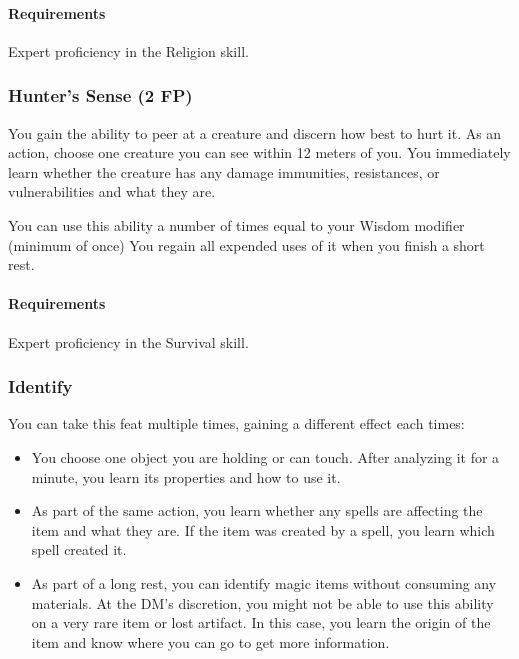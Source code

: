     \paragraph{Requirements} Expert proficiency in the Religion skill.
\subsubsection{Hunter's Sense (2 FP)} \label{feat::hunterssense}
    You gain the ability to peer at a creature and discern how best to hurt it.
    As an action, choose one creature you can see within 12 meters of you.
    You immediately learn whether the creature has any damage immunities, resistances, or vulnerabilities and what they are.

    You can use this ability a number of times equal to your Wisdom modifier (minimum of once)
     You regain all expended uses of it when you finish a short rest.
    \paragraph{Requirements} Expert proficiency in the Survival skill.
\subsubsection{Identify} \label{feat::identify}
    You can take this feat multiple times, gaining a different effect each times:
    \begin{itemize}
        \item You choose one object you are holding or can touch.
        After analyzing it for a minute, you learn its properties and how to use it.
        \item As part of the same action, you learn whether any spells are affecting the item and what they are.
        If the item was created by a spell, you learn which spell created it.
        \item As part of a long rest, you can identify magic items without consuming any materials.
        At the DM's discretion, you might not be able to use this ability on a very rare item or lost artifact.
        In this case, you learn the origin of the item and know where you can go to get more information.
    \end{itemize}
